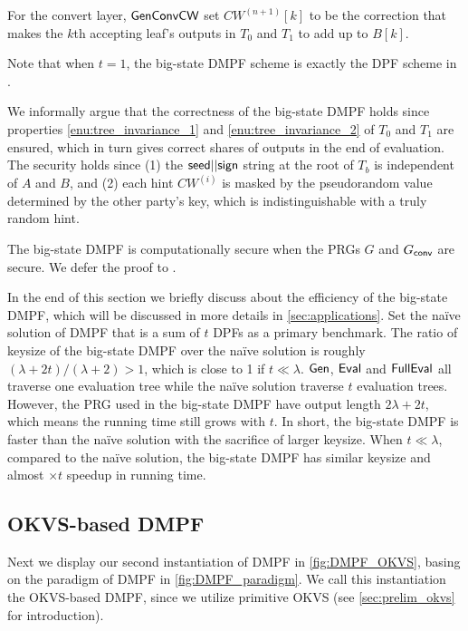 For the convert layer, $\sf GenConvCW$ set $CW^{(n+1)}[k]$ to be the correction that makes the $k$th accepting leaf's outputs in $T_0$ and $T_1$ to add up to $B[k]$. 



\begin{remark}
  Note that when $t=1$, the big-state DMPF scheme is exactly the DPF scheme in \cite{CCS:BoyGilIsh16}. 
\end{remark}

We informally argue that the correctness of the big-state DMPF holds since properties \ref{enu:tree_invariance_1} and \ref{enu:tree_invariance_2} of $T_0$ and $T_1$ are ensured, which in turn gives correct shares of outputs in the end of evaluation. The security holds since (1) the ${\sf seed}||{\sf sign}$ string at the root of $T_b$ is independent of $A$ and $B$, and (2) each hint $CW^{(i)}$ is masked by the pseudorandom value determined by the other party's key, which is indistinguishable with a truly random hint. 

The big-state DMPF is computationally secure when the PRGs $G$ and $G_{\sf conv}$ are secure. We defer the proof to . 

In the end of this section we briefly discuss about the efficiency of the big-state DMPF, which will be discussed in more details in \cref{sec:applications}. Set the na\"ive solution of DMPF that is a sum of $t$ DPFs as a primary benchmark. The ratio of keysize of the big-state DMPF over the na\"ive solution is roughly $(\lambda+2t)/(\lambda+2)>1$, which is close to 1 if $t\ll \lambda$. ${\sf Gen}$, ${\sf Eval}$ and ${\sf FullEval}$ all traverse one evaluation tree while the na\"ive solution traverse $t$ evaluation trees. However, the PRG used in the big-state DMPF have output length $2\lambda+2t$, which means the running time still grows with $t$. In short, the big-state DMPF is faster than the na\"ive solution with the sacrifice of larger keysize. When $t\ll\lambda$, compared to the na\"ive solution, the big-state DMPF has similar keysize and almost $\times t$ speedup in running time. 

\subsection{OKVS-based DMPF}\label{sec:OKVS_based_DMPF}
Next we display our second instantiation of DMPF in \cref{fig:DMPF_OKVS}, basing on the paradigm of DMPF in \cref{fig:DMPF_paradigm}. We call this instantiation the OKVS-based DMPF, since we utilize primitive OKVS (see \cref{sec:prelim_okvs} for introduction). 

